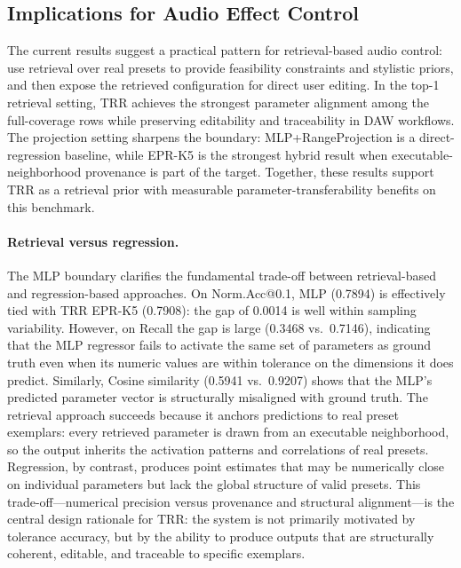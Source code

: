 \subsection{Implications for Audio Effect Control}

The current results suggest a practical pattern for retrieval-based audio control: use retrieval over real presets to provide feasibility constraints and stylistic priors, and then expose the retrieved configuration for direct user editing. In the top-1 retrieval setting, TRR achieves the strongest parameter alignment among the full-coverage rows while preserving editability and traceability in DAW workflows. The projection setting sharpens the boundary: MLP+RangeProjection is a direct-regression baseline, while EPR-K5 is the strongest hybrid result when executable-neighborhood provenance is part of the target. Together, these results support TRR as a retrieval prior with measurable parameter-transferability benefits on this benchmark.

\paragraph{Retrieval versus regression.} The MLP boundary clarifies the fundamental trade-off between retrieval-based and regression-based approaches. On Norm.Acc@0.1, MLP (0.7894) is effectively tied with TRR EPR-K5 (0.7908): the gap of 0.0014 is well within sampling variability. However, on Recall the gap is large (0.3468 vs.\ 0.7146), indicating that the MLP regressor fails to activate the same set of parameters as ground truth even when its numeric values are within tolerance on the dimensions it does predict. Similarly, Cosine similarity (0.5941 vs.\ 0.9207) shows that the MLP's predicted parameter vector is structurally misaligned with ground truth. The retrieval approach succeeds because it anchors predictions to real preset exemplars: every retrieved parameter is drawn from an executable neighborhood, so the output inherits the activation patterns and correlations of real presets. Regression, by contrast, produces point estimates that may be numerically close on individual parameters but lack the global structure of valid presets. This trade-off---numerical precision versus provenance and structural alignment---is the central design rationale for TRR: the system is not primarily motivated by tolerance accuracy, but by the ability to produce outputs that are structurally coherent, editable, and traceable to specific exemplars.

